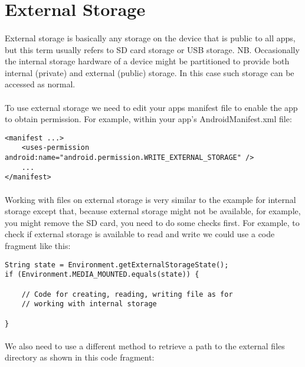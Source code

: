 \section{External Storage}
\paragraph{} External storage is basically any storage on the device that is public to all apps, but this term usually refers to SD card storage or USB storage. NB. Occasionally the internal storage hardware of a device might be partitioned to provide both internal (private) and external (public) storage. In this case such storage can be accessed as normal.

\paragraph{} To use external storage we need to edit your apps manifest file to enable the app to obtain permission. For example, within your app's AndroidManifest.xml file:

\begin{lstlisting}
<manifest ...>
    <uses-permission android:name="android.permission.WRITE_EXTERNAL_STORAGE" />
    ...
</manifest>
\end{lstlisting}

\paragraph{} Working with files on external storage is very similar to the example for internal storage except that, because external storage might not be available, for example, you might remove the SD card, you need to do some checks first. For example, to check if external storage is available to read and write we could use a code fragment like this:

\begin{lstlisting}
String state = Environment.getExternalStorageState();
if (Environment.MEDIA_MOUNTED.equals(state)) {
    
    // Code for creating, reading, writing file as for
    // working with internal storage

}
\end{lstlisting}

\paragraph{} We also need to use a different method to retrieve a path to the external files directory as shown in this code fragment:

